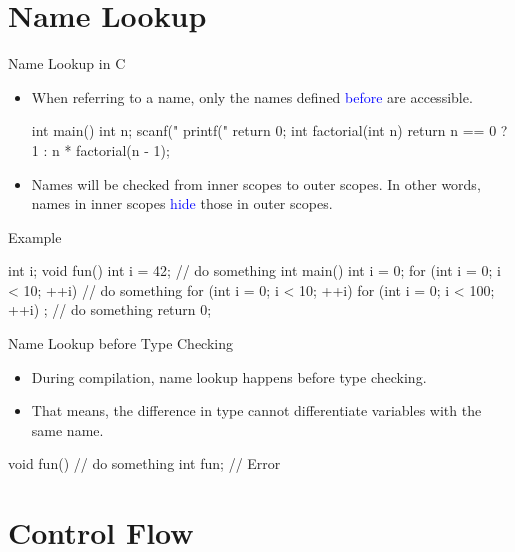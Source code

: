 \documentclass{beamer}
\newcommand{\blue}[1]{\textcolor{blue}{#1}}
\begin{document}
\section{Name Lookup}

\begin{frame}[fragile]{Name Lookup in C}
	\begin{itemize}
		\item When referring to a name, only the names defined \blue{before} are accessible.
		\begin{cpp}
int main() {
  int n; scanf("%
  printf("%
  return 0;
}
int factorial(int n) {
  return n == 0 ? 1 : n * factorial(n - 1);
}
		\end{cpp}
		\item Names will be checked from inner scopes to outer scopes. In other words, names in inner scopes \blue{hide} those in outer scopes.
	\end{itemize}
\end{frame}

\begin{frame}[fragile]{Example}
	\begin{cpp}
int i;
void fun() {
  int i = 42;
  // do something
}
int main() {
  int i = 0;
  for (int i = 0; i < 10; ++i) {
    // do something
  }
  for (int i = 0; i < 10; ++i)
    for (int i = 0; i < 100; ++i)
      ; // do something
  return 0;
}
	\end{cpp}
\end{frame}

\begin{frame}[fragile]{Name Lookup before Type Checking}
	\begin{itemize}
		\item During compilation, name lookup happens before type checking.
		\item That means, the difference in type cannot differentiate variables with the same name.
	\end{itemize}
	\begin{cpp}
void fun() {
  // do something
}
int fun; // Error
	\end{cpp}
\end{frame}

\section{Control Flow}
\end{document}
